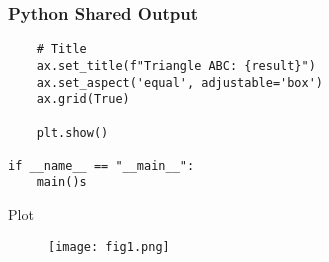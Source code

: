 \documentclass{beamer}
\begin{document}
 \begin{frame}[fragile]
		\frametitle{Python Shared Output}
		\begin{lstlisting}
    # Title
    ax.set_title(f"Triangle ABC: {result}")
    ax.set_aspect('equal', adjustable='box')
    ax.grid(True)

    plt.show()

if __name__ == "__main__":
    main()s
        \end{lstlisting}
        \end{frame}
        \begin{frame}{Plot}
        \begin{figure}
            \centering
            \texttt{[image: fig1.png]}
            \caption{}
            \label{fig:placeholder}
        \end{figure}
        \end{frame}
\end{document}
